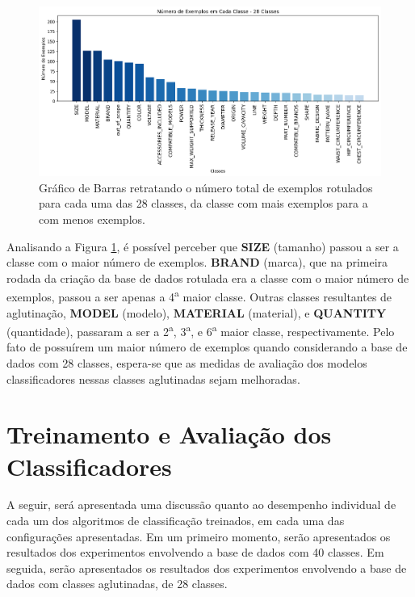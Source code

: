 \begin{figure}[!htb]
    \centering
	\includegraphics[width=1\linewidth]{figuras/número_de_exemplos_28_classes.png}
	\caption{Gráfico de Barras retratando o número total de exemplos rotulados para cada uma das 28 classes, da classe com mais exemplos para a com menos exemplos.}
	\label{fig:número_de_exemplos_28_classes}
\end{figure}

Analisando a Figura \ref{fig:número_de_exemplos_28_classes}, é possível perceber que \textbf{SIZE} (tamanho) passou a ser a classe com o maior número de exemplos. \textbf{BRAND} (marca), que na primeira rodada da criação da base de dados rotulada era a classe com o maior número de exemplos, passou a ser apenas a 4\textsuperscript{a} maior classe. Outras classes resultantes de aglutinação, \textbf{MODEL} (modelo), \textbf{MATERIAL} (material), e \textbf{QUANTITY} (quantidade), passaram a ser a 2\textsuperscript{a}, 3\textsuperscript{a}, e 6\textsuperscript{a} maior classe, respectivamente. Pelo fato de possuírem um maior número de exemplos quando considerando a base de dados com 28 classes, espera-se que as medidas de avaliação dos modelos classificadores nessas classes aglutinadas sejam melhoradas.


\section{Treinamento e Avaliação dos Classificadores}
\label{res:treinamento_avaliacao_dos_classificadores}
A seguir, será apresentada uma discussão quanto ao desempenho individual de cada um dos algoritmos de classificação treinados, em cada uma das configurações apresentadas. Em um primeiro momento, serão apresentados os resultados dos experimentos envolvendo a base de dados com 40 classes. Em seguida, serão apresentados os resultados dos experimentos envolvendo a base de dados com classes aglutinadas, de 28 classes. 

